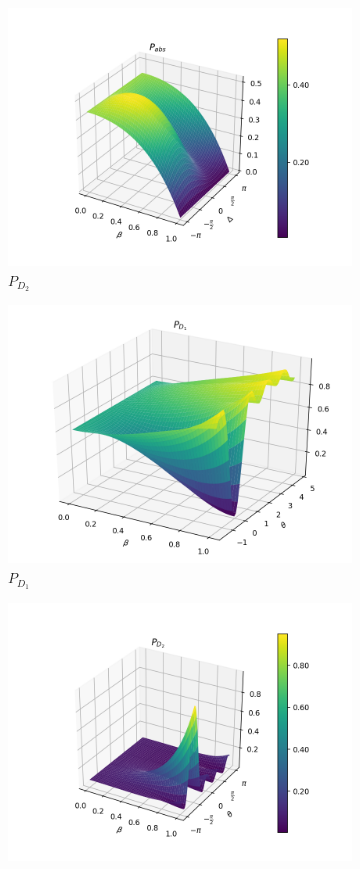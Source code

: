 \documentclass{book}
\begin{document}
\begin{figure}[H]
\begin{subfigure}[b]{0.30\linewidth}
\includegraphics[width=\linewidth]{images/pabs_3.png}
\caption{$P_{D_{2}}$ }
\label{fig:BS1}
\end{subfigure}
\begin{subfigure}[b]{0.30\linewidth}
\includegraphics[width=\linewidth]{images/pd1_5.png}
\caption{$P_{D_{1}}$ }
\label{fig:BS1}
\end{subfigure}
\begin{subfigure}[b]{0.30\linewidth}
\includegraphics[width=\linewidth]{images/pd2_5.png}

\end{subfigure}
\end{figure}
\end{document}
